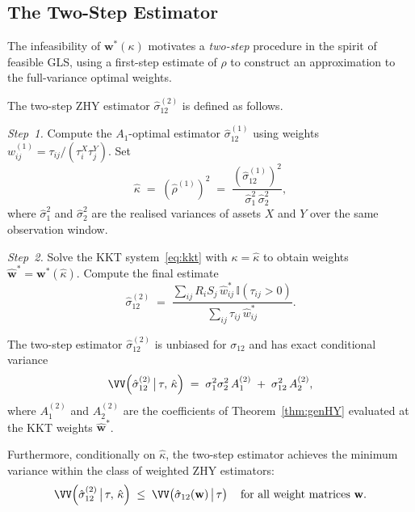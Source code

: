 \subsection{The Two-Step Estimator}\label{sec:twostep}

The infeasibility of $\mathbf{w}^*(\kappa)$ motivates a
\emph{two-step} procedure in the spirit of feasible GLS,
using a first-step estimate of $\rho$ to construct an
approximation to the full-variance optimal weights.

\begin{definition}\label{def:twostep}
The two-step ZHY estimator $\hat{\sigma}_{12}^{(2)}$ is defined
as follows.

\emph{Step~1.} Compute the $A_1$-optimal estimator
$\hat{\sigma}_{12}^{(1)}$ using weights
$w_{ij}^{(1)} = \tau_{ij}/(\tau_i^X\tau_j^Y)$.
Set
\begin{equation}\label{eq:kappa_hat}
    \hat\kappa
    \;=\;
    \left(\hat\rho^{(1)}\right)^2
    \;=\;
    \frac{\left(\hat\sigma_{12}^{(1)}\right)^2}
         {\hat\sigma_1^2\,\hat\sigma_2^2},
\end{equation}
where $\hat\sigma_1^2$ and $\hat\sigma_2^2$ are the realised
variances of assets $X$ and $Y$ over the same observation window.

\emph{Step~2.} Solve the KKT system~\eqref{eq:kkt} with
$\kappa = \hat\kappa$ to obtain weights
$\hat{\mathbf{w}}^* = \mathbf{w}^*(\hat\kappa)$.
Compute the final estimate
\begin{equation}\label{eq:twostep}
    \hat{\sigma}_{12}^{(2)}
    \;=\;
    \frac{\displaystyle\sum_{ij} R_i S_j\,\hat w_{ij}^*\,
          \mathbb{I}(\tau_{ij}>0)}
         {\displaystyle\sum_{ij} \tau_{ij}\,\hat w_{ij}^*}.
\end{equation}
\end{definition}

\begin{thm}\label{thm:twostep}
The two-step estimator $\hat{\sigma}_{12}^{(2)}$ is unbiased for
$\sigma_{12}$ and has exact conditional variance
\begin{equation}\label{eq:var_twostep}
    \VV\!\left(\hat{\sigma}_{12}^{(2)}\,\big|\,\tau,\,\hat\kappa\right)
    \;=\;
    \sigma_1^2\sigma_2^2\,A_1^{(2)}
    \;+\;
    \sigma_{12}^2\,A_2^{(2)},
\end{equation}
where $A_1^{(2)}$ and $A_2^{(2)}$ are the coefficients of
Theorem~\ref{thm:genHY} evaluated at the KKT weights
$\hat{\mathbf{w}}^*$.

Furthermore, conditionally on $\hat\kappa$, the two-step
estimator achieves the minimum variance within the class of
weighted ZHY estimators:
\begin{equation}\label{eq:dominance}
    \VV\!\left(\hat{\sigma}_{12}^{(2)}\,\big|\,\tau,\,\hat\kappa\right)
    \;\leq\;
    \VV\!\left(\hat{\sigma}_{12}(\mathbf{w})\,\big|\,\tau\right)
    \quad \text{for all weight matrices } \mathbf{w}.
\end{equation}
\end{thm}


